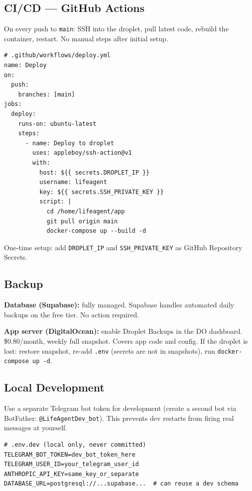 \documentclass[12pt, a4paper]{article}
\begin{document}
\subsection{CI/CD --- GitHub Actions}

On every push to \texttt{main}: SSH into the droplet, pull latest code, rebuild the container, restart. No manual steps after initial setup.

\begin{lstlisting}
# .github/workflows/deploy.yml
name: Deploy
on:
  push:
    branches: [main]
jobs:
  deploy:
    runs-on: ubuntu-latest
    steps:
      - name: Deploy to droplet
        uses: appleboy/ssh-action@v1
        with:
          host: ${{ secrets.DROPLET_IP }}
          username: lifeagent
          key: ${{ secrets.SSH_PRIVATE_KEY }}
          script: |
            cd /home/lifeagent/app
            git pull origin main
            docker-compose up --build -d
\end{lstlisting}

One-time setup: add \texttt{DROPLET\_IP} and \texttt{SSH\_PRIVATE\_KEY} as GitHub Repository Secrets.

\subsection{Backup}

\textbf{Database (Supabase):} fully managed. Supabase handles automated daily backups on the free tier. No action required.

\textbf{App server (DigitalOcean):} enable Droplet Backups in the DO dashboard. \$0.80/month, weekly full snapshot. Covers app code and config. If the droplet is lost: restore snapshot, re-add \texttt{.env} (secrets are not in snapshots), run \texttt{docker-compose up -d}.

\subsection{Local Development}

Use a separate Telegram bot token for development (create a second bot via BotFather: \texttt{@LifeAgentDev\_bot}). This prevents dev restarts from firing real messages at yourself.

\begin{lstlisting}
# .env.dev (local only, never committed)
TELEGRAM_BOT_TOKEN=dev_bot_token_here
TELEGRAM_USER_ID=your_telegram_user_id
ANTHROPIC_API_KEY=same_key_or_separate
DATABASE_URL=postgresql://...supabase...  # can reuse a dev schema
\end{lstlisting}
\end{document}
